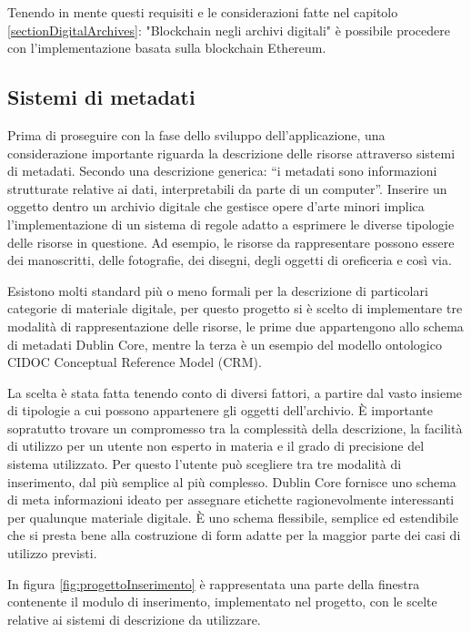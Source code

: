 Tenendo in mente questi requisiti e le considerazioni fatte nel capitolo \ref{sectionDigitalArchives}: "Blockchain negli archivi digitali" è possibile procedere con l'implementazione basata sulla blockchain Ethereum.

\subsection{Sistemi di metadati}

Prima di proseguire con la fase dello sviluppo dell'applicazione, una considerazione importante riguarda la descrizione delle risorse attraverso sistemi di metadati. Secondo una descrizione generica: “i metadati sono informazioni strutturate relative ai dati, interpretabili da parte di un computer”. Inserire un oggetto dentro un archivio digitale che gestisce opere d’arte minori implica l'implementazione di un sistema di regole adatto a esprimere le diverse tipologie delle risorse in questione. Ad esempio, le risorse da rappresentare possono essere dei manoscritti, delle fotografie, dei disegni, degli oggetti di oreficeria e così via.

Esistono molti standard più o meno formali per la descrizione di particolari categorie di materiale digitale, per questo progetto si è scelto di implementare tre modalità di rappresentazione delle risorse, le prime due appartengono allo schema di metadati Dublin Core, mentre la terza è un esempio del modello ontologico CIDOC Conceptual Reference Model (CRM).

La scelta è stata fatta tenendo conto di diversi fattori, a partire dal vasto insieme di tipologie a cui possono appartenere gli oggetti dell'archivio. È importante sopratutto trovare un compromesso tra la complessità della descrizione, la facilità di utilizzo per un utente non esperto in materia e il grado di precisione del sistema utilizzato. Per questo l’utente può scegliere tra tre modalità di inserimento, dal più semplice al più complesso. Dublin Core fornisce uno schema di meta informazioni ideato per assegnare etichette ragionevolmente interessanti per qualunque materiale digitale. È uno schema flessibile, semplice ed estendibile che si presta bene alla costruzione di form adatte per la maggior parte dei casi di utilizzo previsti.

In figura \ref{fig:progettoInserimento} è rappresentata una parte della finestra contenente il modulo di inserimento, implementato nel progetto, con le scelte relative ai sistemi di descrizione da utilizzare.

